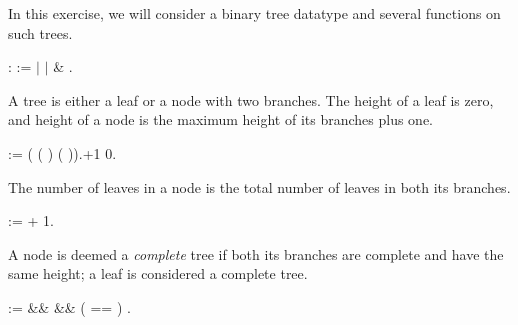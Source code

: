 \begin{exercise}


In this exercise, we will consider a binary tree datatype and
several functions on such trees.


\begin{coqdoccode}
\coqdocemptyline
\coqdocnoindent
{}  :  :=\coqdoceol
\coqdocnoindent
\ensuremath{|} \coqdoceol
\coqdocnoindent
\ensuremath{|}    \& .\coqdoceol
\coqdocemptyline
\end{coqdoccode}


\noindent
A tree is either a leaf or a node with two branches.
The height of a leaf is zero, and height of a node is
the maximum height of its branches plus one.


\begin{coqdoccode}
\coqdocemptyline
\coqdocnoindent
{}   :=\coqdoceol
\coqdocnoindent
{}       ( ( ) ( )).+1  0.\coqdoceol
\coqdocemptyline
\end{coqdoccode}


\noindent
The number of leaves in a node is
the total number of leaves in both its branches.


\begin{coqdoccode}
\coqdocemptyline
\coqdocnoindent
{}   :=\coqdoceol
\coqdocnoindent
{}         +    1.\coqdoceol
\coqdocemptyline
\end{coqdoccode}


\noindent
A node is deemed a \textit{complete} tree if both its branches
are complete and have the same height; a leaf is
considered a complete tree.


\begin{coqdoccode}
\coqdocemptyline
\coqdocnoindent
{}   :=\coqdoceol
\coqdocnoindent
{}         \&\&   \&\& (  ==  )\coqdoceol
\coqdocnoindent
{} .\coqdoceol
\coqdocemptyline
\end{coqdoccode}



\end{exercise}

